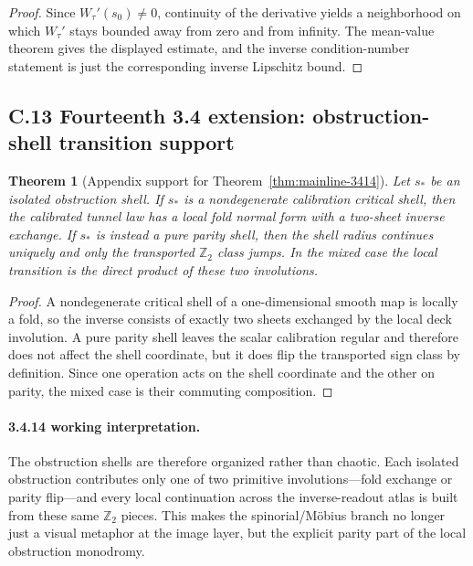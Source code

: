 \documentclass[12pt,a4paper]{article}
\newtheorem{theorem}{Theorem}[section]
\begin{document}
\begin{proof}
Since $W_\tau'(s_0)\neq 0$, continuity of the derivative yields a neighborhood on which $W_\tau'$ stays bounded away from zero and from infinity. The mean-value theorem gives the displayed estimate, and the inverse condition-number statement is just the corresponding inverse Lipschitz bound.
\end{proof}


\subsection*{C.13 Fourteenth 3.4 extension: obstruction-shell transition support}

\begin{theorem}[Appendix support for Theorem~\ref{thm:mainline-3414}]
\label{thm:appendix-3414}
Let $s_\ast$ be an isolated obstruction shell. If $s_\ast$ is a nondegenerate calibration critical shell, then the calibrated tunnel law has a local fold normal form with a two-sheet inverse exchange. If $s_\ast$ is instead a pure parity shell, then the shell radius continues uniquely and only the transported $\mathbb Z_2$ class jumps. In the mixed case the local transition is the direct product of these two involutions.
\end{theorem}

\begin{proof}
A nondegenerate critical shell of a one-dimensional smooth map is locally a fold, so the inverse consists of exactly two sheets exchanged by the local deck involution. A pure parity shell leaves the scalar calibration regular and therefore does not affect the shell coordinate, but it does flip the transported sign class by definition. Since one operation acts on the shell coordinate and the other on parity, the mixed case is their commuting composition.
\end{proof}

\paragraph{3.4.14 working interpretation.}
The obstruction shells are therefore organized rather than chaotic. Each isolated obstruction contributes only one of two primitive involutions---fold exchange or parity flip---and every local continuation across the inverse-readout atlas is built from these same $\mathbb Z_2$ pieces. This makes the spinorial/M\"obius branch no longer just a visual metaphor at the image layer, but the explicit parity part of the local obstruction monodromy.
\end{document}
